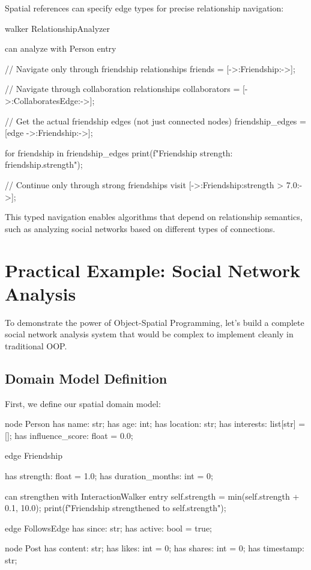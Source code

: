 Spatial references can specify edge types for precise relationship navigation:

\begin{jacblock}
walker RelationshipAnalyzer {
    can analyze with Person entry {
        // Navigate only through friendship relationships
        friends = [->:Friendship:->];

        // Navigate through collaboration relationships
        collaborators = [->:CollaboratesEdge:->];

        // Get the actual friendship edges (not just connected nodes)
        friendship_edges = [edge ->:Friendship:->];

        for friendship in friendship_edges {
            print(f"Friendship strength: {friendship.strength}");
        }

        // Continue only through strong friendships
        visit [->:Friendship:strength > 7.0:->];
    }
}
\end{jacblock}

This typed navigation enables algorithms that depend on relationship semantics, such as analyzing social networks based on different types of connections.

\section{Practical Example: Social Network Analysis}

To demonstrate the power of Object-Spatial Programming, let's build a complete social network analysis system that would be complex to implement cleanly in traditional OOP.

\subsection{Domain Model Definition}

First, we define our spatial domain model:

\begin{jacblock}
node Person {
    has name: str;
    has age: int;
    has location: str;
    has interests: list[str] = [];
    has influence_score: float = 0.0;
}

edge Friendship {
    has strength: float = 1.0;
    has duration_months: int = 0;

    can strengthen with InteractionWalker entry {
        self.strength = min(self.strength + 0.1, 10.0);
        print(f"Friendship strengthened to {self.strength}");
    }
}

edge FollowsEdge {
    has since: str;
    has active: bool = true;
}

node Post {
    has content: str;
    has likes: int = 0;
    has shares: int = 0;
    has timestamp: str;
}
\end{jacblock}

